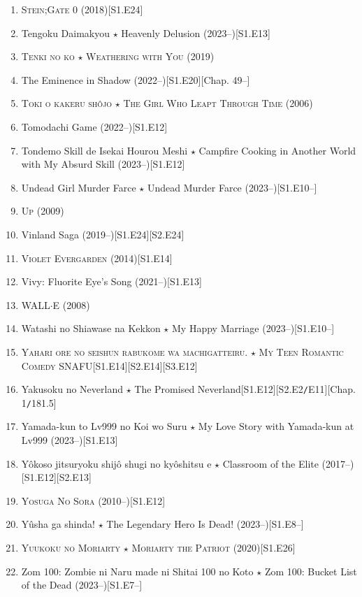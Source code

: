 \documentclass{article}
\begin{document}
\begin{enumerate}
    \item \textsc{Stein;Gate 0} (2018)\hfill[S1.E24]
    \item Tengoku Daimakyou $\star$ Heavenly Delusion (2023--)\hfill[S1.E13]
    \item \textsc{Tenki no ko $\star$ Weathering with You} (2019)
    \item The Eminence in Shadow (2022--)\hfill[S1.E20][Chap. 49--]
    \item \textsc{Toki o kakeru sh\^ojo $\star$ The Girl Who Leapt Through Time} (2006)
    \item Tomodachi Game (2022--)\hfill[S1.E12]
    \item Tondemo Skill de Isekai Hourou Meshi $\star$ Campfire Cooking in Another World with My Absurd Skill (2023--)\hfill[S1.E12]
    \item Undead Girl Murder Farce $\star$ Undead Murder Farce (2023--)\hfill[S1.E10--]
    \item \textsc{Up} (2009)
    \item Vinland Saga (2019--)\hfill[S1.E24][S2.E24]
    \item \textsc{Violet Evergarden} (2014)\hfill[S1.E14]
    \item Vivy: Fluorite Eye's Song (2021--)\hfill[S1.E13]
    \item \textsc{WALL$\cdot$E} (2008)
    \item Watashi no Shiawase na Kekkon $\star$ My Happy Marriage (2023--)\hfill[S1.E10--]
    \item \textsc{Yahari ore no seishun rabukome wa machigatteiru. $\star$ My Teen Romantic Comedy SNAFU}\hfill[S1.E14][S2.E14][S3.E12]
    \item Yakusoku no Neverland $\star$ The Promised Neverland\hfill[S1.E12][S2.E2\texttt{/}E11][Chap. 1\texttt{/}181.5]
    \item Yamada-kun to Lv999 no Koi wo Suru $\star$ My Love Story with Yamada-kun at Lv999 (2023--)\hfill[S1.E13]
    \item Yôkoso jitsuryoku shijô shugi no kyôshitsu e $\star$ Classroom of the Elite (2017--)\hfill[S1.E12][S2.E13]
    \item \textsc{Yosuga No Sora} (2010--)\hfill[S1.E12]
    \item Yûsha ga shinda! $\star$ The Legendary Hero Is Dead! (2023--)\hfill[S1.E8--]
    \item \textsc{Yuukoku no Moriarty $\star$ Moriarty the Patriot} (2020)\hfill[S1.E26]
    \item Zom 100: Zombie ni Naru made ni Shitai 100 no Koto $\star$ Zom 100: Bucket List of the Dead (2023--)\hfill[S1.E7--]
\end{enumerate}
\end{document}

